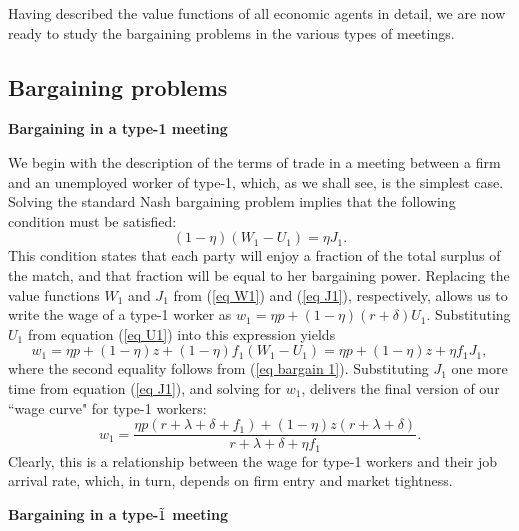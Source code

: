 \documentclass[12pt]{article} %
\theoremstyle{definition}
\begin{document}
Having described the value functions of all economic agents in detail, we are now ready to study the bargaining problems in the various types of meetings. 


\subsection{Bargaining problems}\label{section bargaining} 

\textbf{Bargaining in a type-1 meeting}

\medskip 

\noindent We begin with the description of the terms of trade in a meeting between a firm and an unemployed worker of type-1, which, as we shall see, is the simplest case. Solving the standard Nash bargaining problem implies that the following condition must be satisfied:
\begin{equation}
(1-\eta)(W_1-U_1) = \eta J_1. \label{eq bargain 1}
\end{equation}
This condition states that each party will enjoy a fraction of the total surplus of the match, and that fraction will be equal to her bargaining power. 
Replacing the value functions $W_1$ and $J_1$ from (\ref{eq W1}) and (\ref{eq J1}), respectively, allows us to write the wage of a type-1 worker as $w_1 = \eta p + (1-\eta)(r+\delta)U_1$. Substituting $U_1$ from equation (\ref{eq U1}) into this expression yields  
$$
w_1= \eta p + (1-\eta)z + (1-\eta)f_1(W_1-U_1)=  \eta p + (1-\eta)z + \eta f_1 J_1, 
$$where the second equality follows from (\ref{eq bargain 1}). Substituting $J_1$ one more time from equation (\ref{eq J1}), and solving for $w_1$, delivers the final version of our ``wage curve" for type-1 workers:  
\begin{equation}
 w_1 = \frac{\eta p (r+\lambda+\delta+f_1)+(1-\eta)z(r+\lambda+\delta)}{r+\lambda+\delta + \eta f_1}. \label{eq WC 1}
\end{equation}Clearly, this is a relationship between the wage for type-1 workers and their job arrival rate, which, in turn, depends on firm entry and market tightness. 

\bigskip 


\noindent \textbf{Bargaining in a type-$\Tilde{1}$ meeting}

\medskip 
\end{document}

